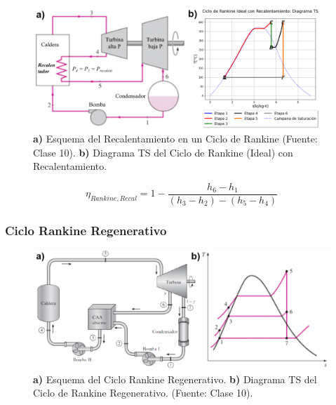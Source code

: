         \begin{figure}
            \includegraphics[width=\textwidth]{img/ciclos/ciclo_rankine_recal.png}
            \caption[Ciclo de Rankine con Recalentamiento]{\textbf{a)} Esquema del Recalentamiento en un Ciclo de Rankine (Fuente: Clase 10). \textbf{b)} Diagrama TS del Ciclo de Rankine (Ideal) con Recalentamiento.}
            \label{fig:ciclo_rankine_recal}
        \end{figure}
        
        \begin{equation}
        \label{ef_rankine_recal}
            \eta_{Rankine, Recal} = 1 - \frac{h_{6}-h_{1}}{(h_{3}-h_{2})-(h_{5}-h_{4})}
        \end{equation}
        
        \subsubsection{Ciclo Rankine Regenerativo}
        
        \begin{quote}
            \textit{}
        \end{quote}
        
        \begin{figure}
            \includegraphics[width=.8\textwidth]{img/clases/ciclo_rankine_reg.png}
            \caption[Ciclo Rankine Regenerativo (Fuente: Clase 10)]{\textbf{a)} Esquema del Ciclo Rankine Regenerativo. \textbf{b)} Diagrama TS del Ciclo de Rankine Regenerativo. (Fuente: Clase 10).}
            \label{fig:ciclo_rankine_reg}
        \end{figure}
        
